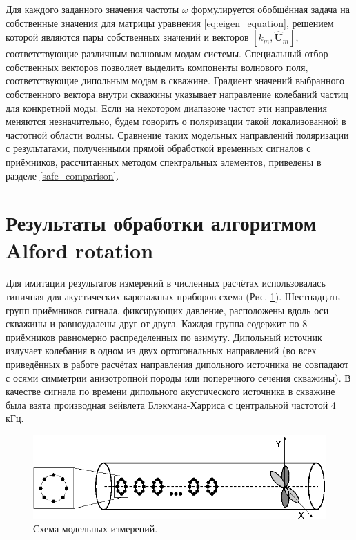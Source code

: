 \documentclass[a4paper,11pt]{article}
\begin{document}
Для каждого заданного значения частоты $\omega$ формулируется обобщённая задача на собственные значения для матрицы уравнения \eqref{eq:eigen_equation}, решением которой являются пары собственных значений и векторов $[k_m, \hat{\mathbf{U}}_m]$, соответствующие различным волновым модам системы. Специальный отбор собственных векторов позволяет выделить компоненты волнового поля, соответствующие дипольным модам в скважине. Градиент значений выбранного собственного вектора внутри скважины указывает направление колебаний частиц для конкретной моды. Если на некотором диапазоне частот эти направления меняются незначительно, будем говорить о поляризации такой локализованной в частотной области волны. Сравнение таких модельных направлений поляризации с результатами, полученными прямой обработкой временных сигналов с приёмников, рассчитанных методом спектральных элементов, приведены в разделе \ref{safe_comparison}.

\section{Результаты обработки алгоритмом Alford rotation}
\label{comparison_alford}
Для имитации результатов измерений в численных расчётах использовалась типичная для акустических каротажных приборов схема (Рис. \ref{fig:measurement_scheme}). Шестнадцать групп приёмников сигнала, фиксирующих давление, расположены вдоль оси скважины и равноудалены друг от друга. Каждая группа содержит по 8 приёмников равномерно распределенных по азимуту. Дипольный источник излучает колебания в одном из двух ортогональных направлений (во всех приведённых в работе расчётах направления дипольного источника не совпадают с осями симметрии анизотропной породы или поперечного сечения скважины). В качестве сигнала по времени дипольного акустического источника в скважине была взята производная вейвлета Блэкмана-Харриса с центральной частотой 4 кГц. 

\begin{figure}[H]
	\includegraphics[width=1\linewidth]{./images/logging_tool_scheme.eps}
	\caption{\footnotesize Схема модельных измерений.}
	\label{fig:measurement_scheme}
\end{figure}
\end{document}
